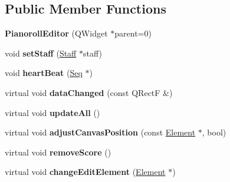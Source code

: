 \subsection*{Public Member Functions}
\begin{DoxyCompactItemize}
\item 
\mbox{\label{class_ms_1_1_pianoroll_editor_ae01ede170c7066a63978968f5de9c515}} 
{\bfseries Pianoroll\+Editor} (Q\+Widget $\ast$parent=0)
\item 
\mbox{\label{class_ms_1_1_pianoroll_editor_a6a8d4aaec83cd4bdc01ea271127e1b7f}} 
void {\bfseries set\+Staff} (\hyperlink{class_ms_1_1_staff}{Staff} $\ast$staff)
\item 
\mbox{\label{class_ms_1_1_pianoroll_editor_a89508b22c9efb3d7a5fc4a8912ca090f}} 
void {\bfseries heart\+Beat} (\hyperlink{class_ms_1_1_seq}{Seq} $\ast$)
\item 
\mbox{\label{class_ms_1_1_pianoroll_editor_a6ba60113a8757d1400693e5ee8a6bc3d}} 
virtual void {\bfseries data\+Changed} (const Q\+RectF \&)
\item 
\mbox{\label{class_ms_1_1_pianoroll_editor_a6d9ced52ee827a8f9364141145d47679}} 
virtual void {\bfseries update\+All} ()
\item 
\mbox{\label{class_ms_1_1_pianoroll_editor_af55e8aa9689ae18846de393af4e28248}} 
virtual void {\bfseries adjust\+Canvas\+Position} (const \hyperlink{class_ms_1_1_element}{Element} $\ast$, bool)
\item 
\mbox{\label{class_ms_1_1_pianoroll_editor_a1e4533ad0b946b1f9ad9a8d0a117c1ea}} 
virtual void {\bfseries remove\+Score} ()
\item 
\mbox{\label{class_ms_1_1_pianoroll_editor_a832bc238c29c0a66e61b806a455659d8}} 
virtual void {\bfseries change\+Edit\+Element} (\hyperlink{class_ms_1_1_element}{Element} $\ast$)
\item 
\mbox{\label{class_ms_1_1_pianoroll_editor_aac8301cc6ebf49e93900598b3ad16663}} 

\end{DoxyCompactItemize}
